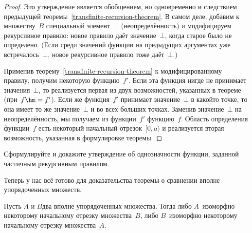\begin{proof}
Это утверждение является обобщением, но одновременно и
следствием предыдущей теоремы~\ref{transfinite-recursion-theorem}. В
самом деле, добавим к множеству~$B$ специальный элемент~$\bot$
( неопределённость) и модифицируем рекурсивное правило:
новое правило даёт значение~$\bot$, когда старое было не
определено. (Если среди значений функции на предыдущих
аргументах уже встречалось~$\bot$, новое рекурсивное правило тоже
даёт~$\bot$.)

Применив теорему~\ref{transfinite-recursion-theorem} к
модифицированному правилу, получим некоторую функцию~$f'$. Если
эта функция нигде не принимает значения~$\bot$, то реализуется
первая из двух возможностей, указанных в теореме
(при~$f\hm=f'$). Если же функция~$f'$ принимает значение~$\bot$
в какой\д то точке, то она имеет то же значение~$\bot$ и во всех
больших точках. Заменив значение~$\bot$ на неопределённость, мы
получаем из функции~$f'$ функцию~$f$. Область определения
функции~$f$ есть некоторый начальный отрезок~$[0,a)$ и
реализуется вторая возможность, указанная в формулировке
теоремы.
\end{proof}

\begin{problem}
Сформулируйте и докажите утверждение об однозначности
функции, заданной частичным рекурсивным правилом.
\end{problem}

Теперь у нас всё готово для доказательства теоремы о
сравнении вполне упорядоченных множеств.

\begin{theorem}\label{comparing-ordinals}
Пусть $A$ и $B$\т два вполне упорядоченных множества. Тогда либо
$A$~изоморфно некоторому начальному отрезку множества~$B$, либо
$B$~изоморфно некоторому начальному отрезку множества~$A$.
\end{theorem}


